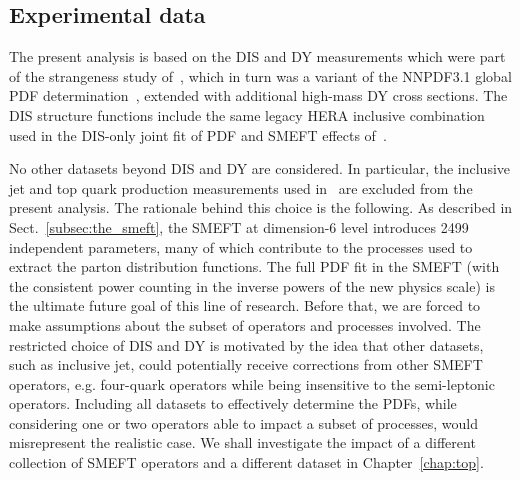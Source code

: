 \documentclass[withindex,glossary]{cam-thesis}
\begin{document}
\subsection{Experimental data}
\label{sec:dy_dataset}

The present analysis is based on the DIS and DY measurements which were part of
the strangeness study of~\cite{Faura:2020oom}, which in turn was a variant of the
NNPDF3.1 global PDF determination~\cite{Ball:2017nwa}, extended with additional high-mass
DY cross sections.
%
The DIS structure functions include the same legacy HERA inclusive combination~\cite{Abramowicz:2015mha}
used in the DIS-only joint fit of PDF and SMEFT effects of~\cite{Carrazza:2019sec}.

No other datasets beyond DIS and DY are considered.
In particular, the inclusive jet and top quark production
measurements used in~\cite{Faura:2020oom} are excluded from the
present analysis.
%
The rationale behind this choice is the following.
As described in Sect.~\ref{subsec:the_smeft}, the SMEFT at dimension-6 level introduces 2499 independent parameters,
many of which contribute to the processes used to extract the parton
distribution functions. The full PDF fit in the SMEFT (with the
consistent power counting in the inverse powers of the new physics
scale) is the ultimate future goal of this line of research. Before
that, we are forced to make assumptions about the subset of operators
and processes involved. The restricted choice of DIS and DY is
motivated by the idea that other datasets, such as inclusive jet,
could potentially receive corrections from other SMEFT operators,
e.g. four-quark operators while being insensitive to the semi-leptonic
operators. Including all datasets to effectively determine the PDFs, while
considering one or two operators able to impact a subset of processes,
would misrepresent the realistic case. We shall investigate the impact of 
a different collection of SMEFT operators and a different dataset in Chapter~\ref{chap:top}.
\end{document}
